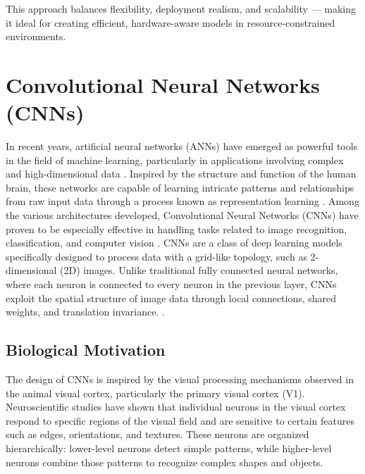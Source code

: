 This approach balances flexibility, deployment realism, and scalability — making it ideal for creating efficient, hardware-aware models in resource-constrained environments.














\section{Convolutional Neural Networks (CNNs)}

In recent years, artificial neural networks (ANNs) have emerged as powerful tools in the field of machine learning, particularly in applications involving complex and high-dimensional data  \cite{lecun2015deep}. Inspired by the structure and function of the human brain, these networks are capable of learning intricate patterns and relationships from raw input data through a process known as representation learning  \cite{bengio2013representation}. Among the various architectures developed, Convolutional Neural Networks (CNNs) have proven to be especially effective in handling tasks related to image recognition, classification, and computer vision \cite{krizhevsky2017imagenet, yamashita2018convolutional}.
CNNs are a class of deep learning models specifically designed to process data with a grid-like topology, such as 2-dimensional (2D) images. Unlike traditional fully connected neural networks, where each neuron is connected to every neuron in the previous layer, CNNs exploit the spatial structure of image data through local connections, shared weights, and translation invariance. \cite{yamashita2018convolutional}.


\subsection{Biological Motivation}
The design of CNNs is inspired by the visual processing mechanisms observed in the animal visual cortex, particularly the primary visual cortex (V1). Neuroscientific studies have shown that individual neurons in the visual cortex respond to specific regions of the visual field and are sensitive to certain features such as edges, orientations, and textures. These neurons are organized hierarchically: lower-level neurons detect simple patterns, while higher-level neurons combine those patterns to recognize complex shapes and objects.


